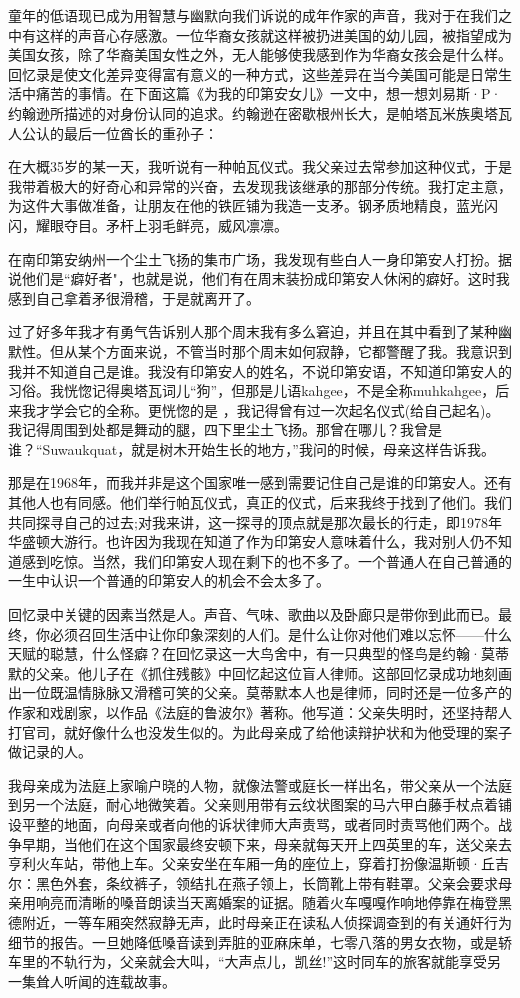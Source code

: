 童年的低语现已成为用智慧与幽默向我们诉说的成年作家的声音，我对于在我们之中有这样的声音心存感激。一位华裔女孩就这样被扔进美国的幼儿园，被指望成为美国女孩，除了华裔美国女性之外，无人能够使我感到作为华裔女孩会是什么样。回忆录是使文化差异变得富有意义的一种方式，这些差异在当今美国可能是日常生活中痛苦的事情。在下面这篇《为我的印第安女儿》一文中，想一想刘易斯·P·约翰逊所描述的对身份认同的追求。约翰逊在密歇根州长大，是帕塔瓦米族奥塔瓦人公认的最后一位酋长的重孙子：

在大概35岁的某一天，我听说有一种帕瓦仪式。我父亲过去常参加这种仪式，于是我带着极大的好奇心和异常的兴奋，去发现我该继承的那部分传统。我打定主意，为这件大事做准备，让朋友在他的铁匠铺为我造一支矛。钢矛质地精良，蓝光闪闪，耀眼夺目。矛杆上羽毛鲜亮，威风凛凛。

在南印第安纳州一个尘土飞扬的集市广场，我发现有些白人一身印第安人打扮。据说他们是“癖好者"，也就是说，他们有在周末装扮成印第安人休闲的癖好。这时我感到自己拿着矛很滑稽，于是就离开了。

过了好多年我才有勇气告诉别人那个周末我有多么窘迫，并且在其中看到了某种幽默性。但从某个方面来说，不管当时那个周末如何寂静，它都警醒了我。我意识到我并不知道自己是谁。我没有印第安人的姓名，不说印第安语，不知道印第安人的习俗。我恍惚记得奥塔瓦词儿“狗”，但那是儿语kahgee，不是全称muhkahgee，后来我才学会它的全称。更恍惚的是 ，我记得曾有过一次起名仪式(给自己起名)。我记得周围到处都是舞动的腿，四下里尘土飞扬。那曾在哪儿？我曾是谁？“Suwaukquat，就是树木开始生长的地方，”我问的时候，母亲这样告诉我。

那是在1968年，而我并非是这个国家唯一感到需要记住自己是谁的印第安人。还有其他人也有同感。他们举行帕瓦仪式，真正的仪式，后来我终于找到了他们。我们共同探寻自己的过去;对我来讲，这一探寻的顶点就是那次最长的行走，即1978年华盛顿大游行。也许因为我现在知道了作为印第安人意味着什么，我对别人仍不知道感到吃惊。当然，我们印第安人现在剩下的也不多了。一个普通人在自己普通的一生中认识一个普通的印第安人的机会不会太多了。

回忆录中关键的因素当然是人。声音、气味、歌曲以及卧廊只是带你到此而已。最终，你必须召回生活中让你印象深刻的人们。是什么让你对他们难以忘怀——什么天赋的聪慧，什么怪癖？在回忆录这一大鸟舍中，有一只典型的怪鸟是约翰·莫蒂默的父亲。他儿子在《抓住残骸》中回忆起这位盲人律师。这部回忆录成功地刻画出一位既温情脉脉又滑稽可笑的父亲。莫蒂默本人也是律师，同时还是一位多产的作家和戏剧家，以作品《法庭的鲁波尔》著称。他写道：父亲失明时，还坚持帮人打官司，就好像什么也没发生似的。为此母亲成了给他读辩护状和为他受理的案子做记录的人。

我母亲成为法庭上家喻户晓的人物，就像法警或庭长一样出名，带父亲从一个法庭到另一个法庭，耐心地微笑着。父亲则用带有云纹状图案的马六甲白藤手杖点着铺设平整的地面，向母亲或者向他的诉状律师大声责骂，或者同时责骂他们两个。战争早期，当他们在这个国家最终安顿下来，母亲就每天开上四英里的车，送父亲去亨利火车站，带他上车。父亲安坐在车厢一角的座位上，穿着打扮像温斯顿·丘吉尔：黑色外套，条纹裤子，领结扎在燕子领上，长筒靴上带有鞋罩。父亲会要求母亲用响亮而清晰的嗓音朗读当天离婚案的证据。随着火车嘎嘎作响地停靠在梅登黑德附近，一等车厢突然寂静无声，此时母亲正在读私人侦探调查到的有关通奸行为细节的报告。一旦她降低嗓音读到弄脏的亚麻床单，七零八落的男女衣物，或是轿车里的不轨行为，父亲就会大叫，“大声点儿，凯丝!”这时同车的旅客就能享受另一集耸人听闻的连载故事。

